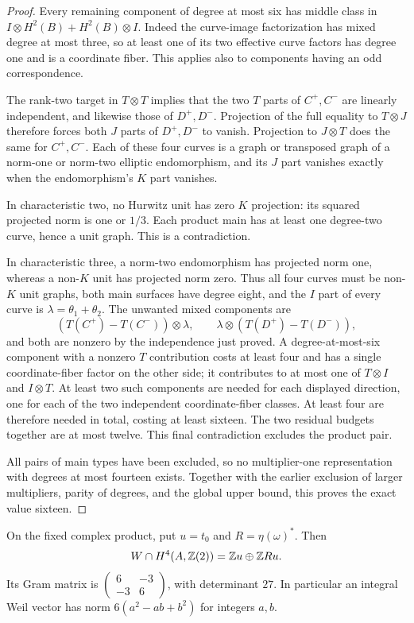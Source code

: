 \begin{proof}
Every remaining component of degree at most six has middle class in
$I\otimes H^2(B)+H^2(B)\otimes I$. Indeed the curve-image
factorization has mixed degree at most three, so at least one of its
two effective curve factors has degree one and is a coordinate fiber.
This applies also to components having an odd correspondence.

The rank-two target in $T\otimes T$ implies that the two $T$ parts of
$C^+,C^-$ are linearly independent, and likewise those of $D^+,D^-$.
Projection of the full equality to $T\otimes J$ therefore forces
both $J$ parts of $D^+,D^-$ to vanish. Projection to $J\otimes T$
does the same for $C^+,C^-$. Each of these four curves is a graph or
transposed graph of a norm-one or norm-two elliptic endomorphism,
and its $J$ part vanishes exactly when the endomorphism's $K$ part
vanishes.

In characteristic two, no Hurwitz unit has zero $K$ projection:
its squared projected norm is one or $1/3$. Each product main has at
least one degree-two curve, hence a unit graph. This is a contradiction.

In characteristic three, a norm-two endomorphism has projected norm
one, whereas a non-$K$ unit has projected norm zero. Thus all four
curves must be non-$K$ unit graphs, both main surfaces have degree
eight, and the $I$ part of every curve is
$\lambda=\theta_1+\theta_2$. The unwanted mixed components are
\[
 (T(C^+)-T(C^-))\otimes\lambda,
 \qquad \lambda\otimes(T(D^+)-T(D^-)),
\]
and both are nonzero by the independence just proved. A degree-at-most-six
component with a nonzero $T$ contribution costs at least four and
has a single coordinate-fiber factor on the other side; it contributes
to at most one of $T\otimes I$ and $I\otimes T$. At least two
such components are needed for each displayed direction, one for
each of the two independent coordinate-fiber classes. At least four
are therefore needed in total, costing at least sixteen. The two
residual budgets together are at most twelve. This final contradiction
excludes the product pair.

All pairs of main types have been excluded, so no multiplier-one
representation with degrees at most fourteen exists. Together with
the earlier exclusion of larger multipliers, parity of degrees, and
the global upper bound, this proves the exact value sixteen.
\end{proof}

\begin{proposition}
\label{prop:V07}
On the fixed complex product, put $u=t_0$ and $R=\eta(\omega)^*$.
Then
\[
 W\cap H^4(A,\mathbb Z(2))=\mathbb Z u\oplus\mathbb Z Ru.
\]
Its Gram matrix is
$\left(\begin{smallmatrix}6&-3\\-3&6\end{smallmatrix}\right)$,
with determinant $27$. In particular an integral Weil vector has
norm $6(a^2-ab+b^2)$ for integers $a,b$.
\end{proposition}

